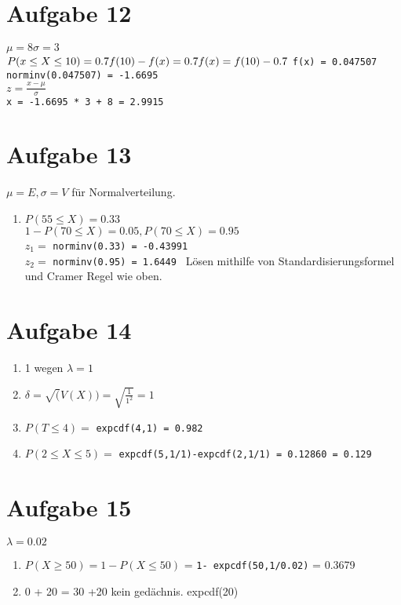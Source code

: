 \documentclass[a4paper,10pt]{scrbook}
\begin{document}
\section*{Aufgabe 12}
$ \mu = 8 \sigma = 3$ \\
$ P(x\leq X \leq 10) = 0.7 \\
f(10) - f(x) = 0.7 \\
f(x) = f(10) - 0.7 \\$
\texttt{f(x) = 0.047507 \\
norminv(0.047507) = -1.6695 }\\
$ z = \frac{x - \mu}{\sigma}$\\
\texttt{x = -1.6695 * 3 + 8 = 2.9915}

\section*{Aufgabe 13}
$\mu = E , \sigma = V $ für Normalverteilung.\\
\begin{enumerate}
 \item $P(55 \leq X) = 0.33$ \\
 $1-P(70 \leq X) = 0.05, P (70 \leq X) = 0.95$\\
 $z_1 = $ \texttt{norminv(0.33) = -0.43991}\\
 $z_2 =$ \texttt{norminv(0.95) = 1.6449 }
 Lösen mithilfe von Standardisierungsformel und Cramer Regel wie oben.
\end{enumerate}

\section*{Aufgabe 14}
\begin{enumerate}
 \item 1 wegen $ \lambda = 1$
 \item  $\delta = \sqrt(V(X)) = \sqrt{\frac{1}{1^2}} = 1$
 \item $P(T \leq 4) = $ \texttt{expcdf(4,1) = 0.982}
 \item $ P(2 \leq X \leq 5) = $ \texttt{expcdf(5,1/1)-expcdf(2,1/1) = 0.12860 = 0.129}
\end{enumerate}

\section*{Aufgabe 15}
$\lambda =  0.02$ \\
\begin{enumerate}
 \item $ P( X \geq 50) = 1-P(X \leq 50) $ = \texttt{1- expcdf(50,1/0.02)} = 0.3679
\item 0 + 20 = 30 +20 kein gedächnis. expcdf(20)	
\end{enumerate}
\end{document}
